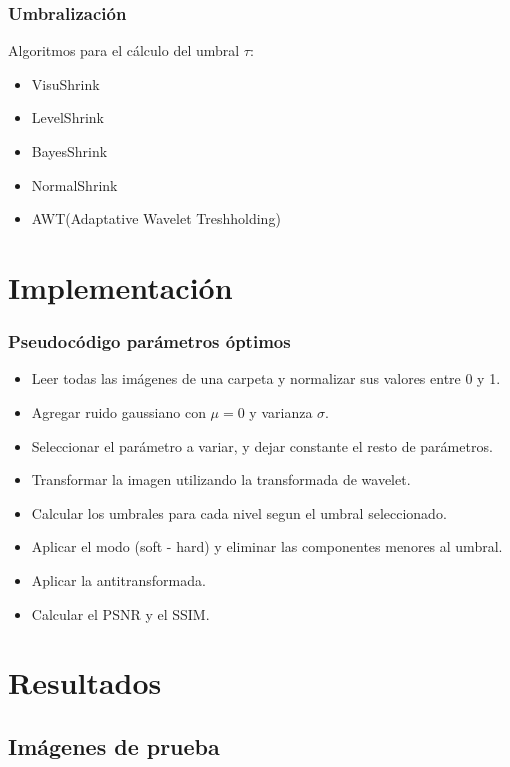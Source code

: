 \documentclass{beamer}
\begin{document}
\begin{frame}
  \frametitle{Umbralización}
Algoritmos para el cálculo del umbral $\tau$:
\begin{itemize}
  \item VisuShrink
  \item LevelShrink
  \item BayesShrink
  \item NormalShrink
  \item AWT(Adaptative Wavelet Treshholding)
\end{itemize}
\end{frame}






  \section{Implementación}

  \begin{frame}
    \frametitle{Pseudocódigo parámetros óptimos}
  
    \begin{itemize}
      \item Leer todas las imágenes de una carpeta y normalizar sus valores entre 0 y 1.
      \item Agregar ruido gaussiano con $\mu=0$ y varianza $\sigma$.
      \item Seleccionar el parámetro a variar, y dejar constante el resto de parámetros.
      \item Transformar la imagen utilizando la transformada de wavelet.
      \item Calcular los umbrales para cada nivel segun el umbral seleccionado.
      \item Aplicar el modo (soft - hard) y eliminar las componentes menores al umbral.
      \item Aplicar la antitransformada.
      \item Calcular el PSNR y el SSIM.
    \end{itemize}
  
  \end{frame}

  \section{Resultados}

  \subsection{Imágenes de prueba}
\end{document}
